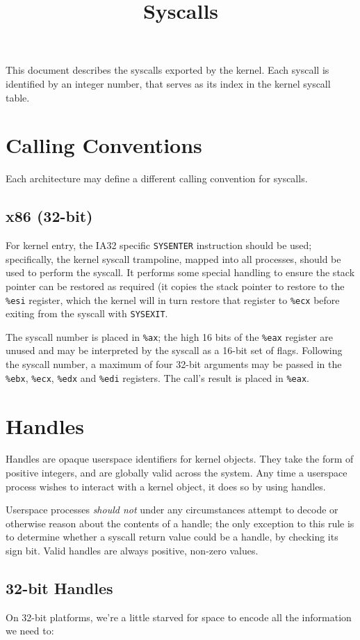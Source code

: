 \documentclass[11pt]{article}
\title{Syscalls}
\begin{document}
This document describes the syscalls exported by the kernel. Each syscall is identified by an integer number, that serves as its index in the kernel syscall table.

\tableofcontents
\newpage

\section{Calling Conventions}
Each architecture may define a different calling convention for syscalls.

\subsection{x86 (32-bit)}
For kernel entry, the IA32 specific \texttt{SYSENTER} instruction should be used; specifically, the kernel syscall trampoline, mapped into all processes, should be used to perform the syscall. It performs some special handling to ensure the stack pointer can be restored as required (it copies the stack pointer to restore to the \texttt{\%esi} register, which the kernel will in turn restore that register to \texttt{\%ecx} before exiting from the syscall with \texttt{SYSEXIT}.

The syscall number is placed in \texttt{\%ax}; the high 16 bits of the \texttt{\%eax} register are unused and may be interpreted by the syscall as a 16-bit set of flags. Following the syscall number, a maximum of four 32-bit arguments may be passed in the \texttt{\%ebx}, \texttt{\%ecx}, \texttt{\%edx} and \texttt{\%edi} registers. The call's result is placed in \texttt{\%eax}.

\section{Handles}
Handles are opaque userspace identifiers for kernel objects. They take the form of positive integers, and are globally valid across the system. Any time a userspace process wishes to interact with a kernel object, it does so by using handles.

Userspace processes \textit{should not} under any circumstances attempt to decode or otherwise reason about the contents of a handle; the only exception to this rule is to determine whether a syscall return value could be a handle, by checking its sign bit. Valid handles are always positive, non-zero values.

\subsection{32-bit Handles}
On 32-bit platforms, we're a little starved for space to encode all the information we need to:
\end{document}
